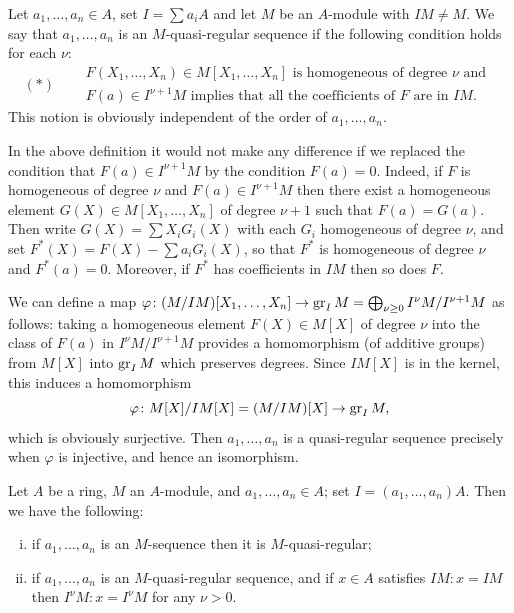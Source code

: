 \begin{definition}
Let $a_1, \ldots, a_n \in A$, set $I = \sum a_iA$ and let $M$ be an $A$-module
with $IM \neq M$. We say that $a_1, \ldots, a_n$ is an $M$-quasi-regular sequence if the
following condition holds for each $\nu$:
\[
  (*) \quad
  \begin{aligned}
    &F(X_1, \ldots, X_n) \in M[X_1, \ldots, X_n] \text{ is homogeneous of degree } \nu \text{ and }\\
    &F(a) \in I^{\nu+1}M \text{ implies that all the coefficients of } F \text{ are in } IM.
  \end{aligned}
\]
This notion is obviously independent of the order of $a_1, \ldots, a_n$.
\end{definition}

In the above definition it would not make any difference if we replaced
the condition that $F(a) \in I^{\nu+1}M$ by the condition $F(a) = 0$. Indeed, if $F$ is
homogeneous of degree $\nu$ and $F(a) \in I^{\nu+1}M$ then there exist a homogeneous
element $G(X) \in M[X_1, \ldots, X_n]$ of degree $\nu + 1$ such that $F(a) = G(a)$. Then
write $G(X) = \sum X_iG_i(X)$ with each $G_i$ homogeneous of degree $\nu$, and set
$F^*(X) = F(X) - \sum a_iG_i(X)$, so that $F^*$ is homogeneous of degree $\nu$ and
$F^*(a) = 0$. Moreover, if $F^*$ has coefficients in $IM$ then so does $F$.

We can define a map $\varphi\colon (M/IM)[X_1, \ldots, X_n] \to \operatorname{gr}_I M = \bigoplus_{\nu \ge 0}
I^\nu M/I^{\nu+1}M$ as follows: taking a homogeneous element $F(X) \in M[X]$ of
degree $\nu$ into the class of $F(a)$ in $I^\nu M/I^{\nu+1}M$ provides a homomorphism (of
additive groups) from $M[X]$ into $\operatorname{gr}_I M$ which preserves degrees. Since
$IM[X]$ is in the kernel, this induces a homomorphism
\[
  \varphi\colon M[X]/IM[X] = (M/IM)[X] \to \operatorname{gr}_I M,
\]
which is obviously surjective. Then $a_1, \ldots, a_n$ is a quasi-regular sequence
precisely when $\varphi$ is injective, and hence an isomorphism.

\begin{theorem}\label{thm:16.2}
Let $A$ be a ring, $M$ an $A$-module, and $a_1, \ldots, a_n \in A$; set
$I = (a_1, \ldots, a_n)A$. Then we have the following:
\begin{enumerate}[(i)]
  \item if $a_1, \ldots, a_n$ is an $M$-sequence then it is $M$-quasi-regular;
  \item if $a_1, \ldots, a_n$ is an $M$-quasi-regular sequence, and if $x \in A$ satisfies
        $IM:x = IM$ then $I^\nu M:x = I^\nu M$ for any $\nu > 0$.
\end{enumerate}
\end{theorem}

